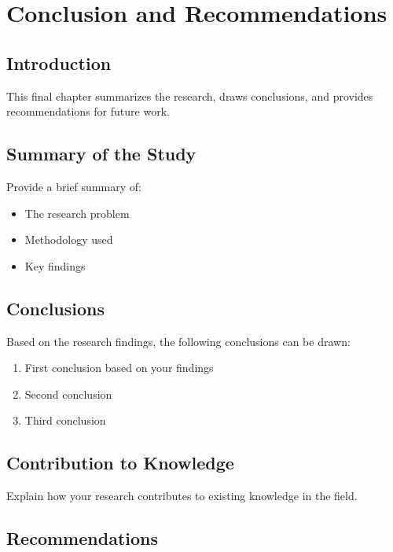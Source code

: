 
\chapter{Conclusion and Recommendations}

\section{Introduction}

This final chapter summarizes the research, draws conclusions, and provides recommendations for future work.

\section{Summary of the Study}

Provide a brief summary of:
\begin{itemize}
    \item The research problem
    \item Methodology used
    \item Key findings
\end{itemize}

\section{Conclusions}

Based on the research findings, the following conclusions can be drawn:

\begin{enumerate}
    \item First conclusion based on your findings
    \item Second conclusion
    \item Third conclusion
\end{enumerate}

\section{Contribution to Knowledge}

Explain how your research contributes to existing knowledge in the field.

\section{Recommendations}

